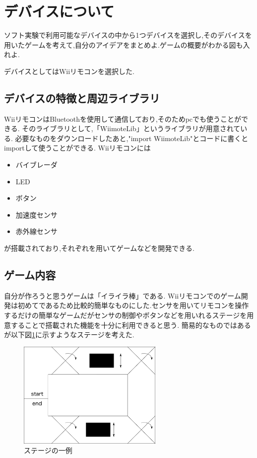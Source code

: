 \documentclass{jarticle}
\begin{document}
\section{デバイスについて}
ソフト実験で利用可能なデバイスの中から1つデバイスを選択し,そのデバイスを用いたゲームを考えて,自分のアイデアをまとめよ.ゲームの概要がわかる図も入れよ.

デバイスとしてはWiiリモコンを選択した.
\subsection{デバイスの特徴と周辺ライブラリ}
WiiリモコンはBluetoothを使用して通信しており,そのためpcでも使うことができる.
そのライブラリとして,「WiimoteLib」というライブラリが用意されている.
必要なものをダウンロードしたあと,"import WiimoteLib"とコードに書くとimportして使うことができる.
Wiiリモコンには

\begin{itemize}

\item バイブレーダ
\item LED
\item ボタン
\item 加速度センサ
\item 赤外線センサ

\end{itemize}
が搭載されており,それぞれを用いてゲームなどを開発できる.

\subsection{ゲーム内容}

自分が作ろうと思うゲームは「イライラ棒」である. Wiiリモコンでのゲーム開発は初めてであるため比較的簡単なものにした.センサを用いてリモコンを操作するだけの簡単なゲームだがセンサの制御やボタンなどを用いれるステージを用意することで搭載された機能を十分に利用できると思う.
簡易的なものではあるが以下図\ref{fig:stage}に示すようなステージを考えた.

\begin{figure}[H]
\begin{center}
\includegraphics[width=7.0cm]{device.png}
\caption{ステージの一例}
\label{fig:stage}
\end{center}
\end{figure}
\end{document}
